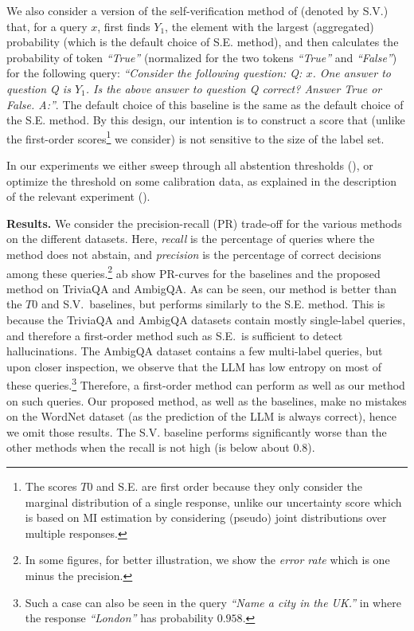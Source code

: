 \documentclass[a4paper]{article}
\theoremstyle{plain}
\theoremstyle{definition}
\theoremstyle{plain}
\begin{document}
We also consider a version of the self-verification method of \citet{KCAHD2022} (denoted by S.V.) that, for a query $x$, first finds $Y_1$, the element with the largest (aggregated) probability (which is the default choice of S.E. method), and then calculates the probability of token \emph{``True''} (normalized for the two tokens \emph{``True''} and \emph{``False''}) for the following query: \emph{``Consider the following question: Q: $x$. One answer to question Q is $Y_1$. Is the above answer to question Q correct? Answer True or False. A:''}. The default choice of this baseline is the same as the default choice of the S.E. method. By this design, our intention is to construct a score that (unlike the first-order scores\footnote{The scores $T0$ and S.E. are first order because they only consider the marginal distribution of a single response, unlike our uncertainty score which is based on MI estimation by considering (pseudo) joint distributions over multiple responses.} we consider) is not sensitive to the size of the label set.


In our experiments we either sweep through all abstention thresholds (), or optimize the threshold on some calibration data, as explained in the description of the relevant experiment ().

\textbf{Results.} 
We consider the precision-recall (PR) trade-off for the various methods on the different datasets. Here, \emph{recall} is the percentage of queries where the method does not abstain, and \emph{precision} is the percentage of correct decisions among these queries.\footnote{In some figures, for better illustration, we show the \emph{error rate} which is one minus the precision.}
ab show PR-curves for the baselines and the proposed method on TriviaQA and AmbigQA. As can be seen, our method is better than the $T0$ and S.V.\ baselines, but performs similarly to the S.E. method. This is because the TriviaQA and AmbigQA datasets contain mostly single-label queries, and therefore a first-order method such as S.E.\ is sufficient to detect hallucinations. The AmbigQA dataset contains a few multi-label queries, but upon closer inspection, we observe that the LLM has low entropy on most of these queries.\footnote{Such a case can also be seen in the query \emph{``Name a city in the UK.''} in  where the response \emph{``London''} has probability $0.958$.} Therefore, a first-order method can perform as well as our method on such queries. Our proposed method, as well as the baselines, make no mistakes on the WordNet dataset (as the prediction of the LLM is always correct), 
hence we omit those results. The S.V. baseline performs significantly worse than the other methods when the recall is not high (is below about 0.8).  
\end{document}
